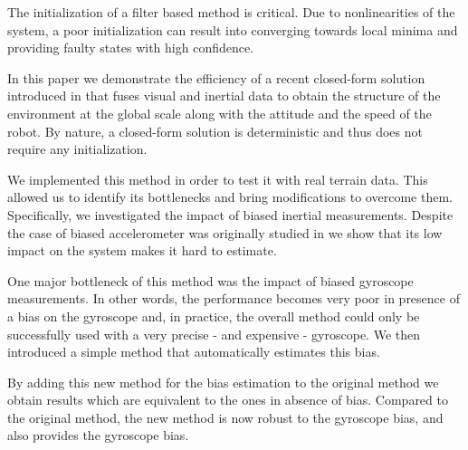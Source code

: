 \documentclass[letterpaper, 10 pt, conference]{ieeeconf}  %
\begin{document}
The initialization of a filter based method is critical.
Due to nonlinearities of the system, a poor initialization can result into converging towards local minima and  providing faulty states with high confidence.

In this paper we demonstrate the efficiency of a recent closed-form solution introduced in \cite{Martinelli2012}\cite{Martinelli2014} that fuses visual and inertial data to obtain the structure of the environment at the global scale along with the attitude and the speed of the robot.
By nature, a closed-form solution is deterministic and thus does not require any initialization.


We implemented this method in order to test it with real terrain data.
This allowed us to identify its bottlenecks and bring modifications to overcome them.
Specifically, we investigated the impact of biased inertial measurements.
Despite the case of biased accelerometer was originally studied in \cite{Martinelli2014} we show that its low impact on the system makes it hard to estimate.


One major bottleneck of this method was the impact of biased gyroscope measurements.
In other words, the performance becomes very poor in presence of a bias on the gyroscope and, in practice, the overall method could only be successfully used with a very precise - and expensive - gyroscope.
We then introduced a simple method that automatically estimates this bias.


By adding this new method for the bias estimation to the original method we obtain results which are equivalent to the ones in absence of bias.
Compared to the original method, the new method is now robust to the gyroscope bias, and also provides the gyroscope bias.
\end{document}
